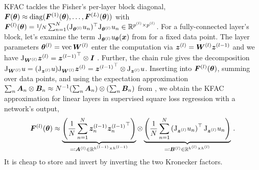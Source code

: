 KFAC tackles the Fisher's per-layer block diagonal, ${\bm{F}}({\bm{\theta}}) \approx \operatorname{diag}({\bm{F}}^{(1)}({\bm{\theta}}), \dots, {\bm{F}}^{(L)}({\bm{\theta}}))$ with ${\bm{F}}^{(l)}({\bm{\theta}}) = \nicefrac{1}{N} \sum_{n=1}^N (\mathrm{J}_{{\bm{\theta}}^{(l)}} u_n)^{\top} \mathrm{J}_{{\bm{\theta}}^{(l)}} u_n \in {\mathbb{R}}^{ p^{(l)} \times p^{(l)} }$.
For a fully-connected layer's block, let's examine the term $\mathrm{J}_{{\bm{\theta}}^{(l)}} u_{{\bm{\theta}}}({\bm{x}})$ from  for a fixed data point.
The layer parameters ${\bm{\theta}}^{(l)} = \operatorname{vec} {\bm{W}}^{(l)}$ enter the computation via ${\bm{z}}^{(l)} = {\bm{W}}^{(l)}{\bm{z}}^{(l-1)}$ and we have $\mathrm{J}_{{\bm{W}}^{(l)}} {\bm{z}}^{(l)} = {{\bm{z}}^{(l-1)}}^\top \otimes {\bm{I}}$ \citep[e.g.][]{dangel2020modular}.
Further, the chain rule gives the decomposition $\mathrm{J}_{{\bm{W}}^{(l)}} u = (\mathrm{J}_{{\bm{z}}^{(l)}} u) \mathrm{J}_{{\bm{W}}^{(l)}} {\bm{z}}^{(l)} = {{\bm{z}}^{(l-1)}}^\top\otimes \mathrm{J}_{{\bm{z}}^{(l)}} u$.
Inserting into ${\bm{F}}^{(l)}({\bm{\theta}})$, summing over data points, and using the expectation approximation $\sum_n {\bm{A}}_n \otimes {\bm{B}}_n \approx N^{-1}(\sum_n {\bm{A}}_n) \otimes (\sum_n {\bm{B}}_n)$ from \citet{martens2015optimizing}, we obtain the KFAC approximation for linear layers in supervised square loss regression with a network's output,
\begin{equation}\label{eq:kfac-linear}
  {\bm{F}}^{(l)}({\bm{\theta}})
  \approx
  \underbrace{
    \left(
      \frac{1}{N}
      \sum_{n=1}^N {\bm{z}}^{(l-1)}_n {{\bm{z}}^{(l-1)}_n}^\top
    \right)
  }_{\eqqcolon {\bm{A}}^{(l)} \in {\mathbb{R}}^{h^{(l-1)} \times h^{(l-1)}}}
  \otimes
  \underbrace{
    \left(
      \frac{1}{N}
      \sum_{n=1}^N
      \left(\mathrm{J}_{{\bm{z}}^{(l)}}  u_n \right)^\top
      \mathrm{J}_{{\bm{z}}^{(l)}}  u_n
    \right)
  }_{\eqqcolon {\bm{B}}^{(l)} \in {\mathbb{R}}^{h^{(l)} \times h^{(l)} }}\,.
\end{equation}
It is cheap to store and invert by inverting the two Kronecker factors.

